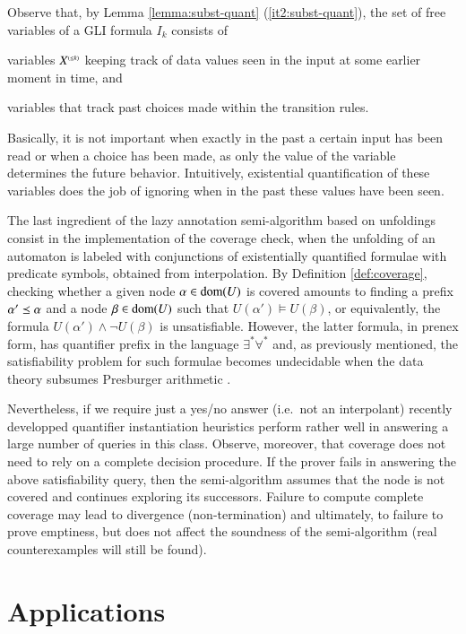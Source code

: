 Observe that, by Lemma \ref{lemma:subst-quant}
(\ref{it2:subst-quant}), the set of free variables of a GLI formula
$I_k$ consists of \begin{inparaenum}[(i)]
\item variables ${X}^{\scriptscriptstyle{({\leq k})}}$ keeping track of data values seen
  in the input at some earlier moment in time, and
%
\item variables that track past choices made within the transition
  rules.
\end{inparaenum}
Basically, it is not important when exactly in the past a certain
input has been read or when a choice has been made, as only the value
of the variable determines the future behavior. Intuitively,
existential quantification of these variables does the job of ignoring
when in the past these values have been seen.

The last ingredient of the lazy annotation semi-algorithm based on
unfoldings consist in the implementation of the coverage check, when
the unfolding of an automaton is labeled with conjunctions of
existentially quantified formulae with predicate symbols, obtained
from interpolation. By Definition \ref{def:coverage}, checking whether
a given node $\alpha \in \mathrm{dom}(U)$ is covered amounts to finding a
prefix $\alpha' \preceq \alpha$ and a node $\beta \in \mathrm{dom}(U)$ such
that $U(\alpha') \models U(\beta)$, or equivalently, the formula
$U(\alpha') \wedge \neg U(\beta)$ is unsatisfiable. However, the
latter formula, in prenex form, has quantifier prefix in the language
$\exists^*\forall^*$ and, as previously mentioned, the satisfiability
problem for such formulae becomes undecidable when the data theory
subsumes Presburger arithmetic \cite{Halpern91}.

Nevertheless, if we require just a yes/no answer (i.e.\ not an
interpolant) recently developped quantifier instantiation heuristics
\cite{ReynoldsKK17} perform rather well in answering a large number of
queries in this class. Observe, moreover, that coverage does not need
to rely on a complete decision procedure. If the prover fails in
answering the above satisfiability query, then the semi-algorithm
assumes that the node is not covered and continues exploring its
successors. Failure to compute complete coverage may lead to
divergence (non-termination) and ultimately, to failure to prove
emptiness, but does not affect the soundness of the semi-algorithm
(real counterexamples will still be found).

\ifLongVersion
\section{Applications}
\label{sec:applications}


